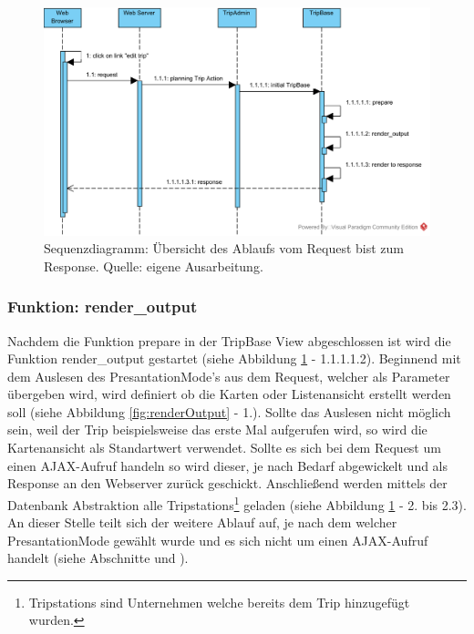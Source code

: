 \documentclass[Bachelorarbeit.tex]{subfiles}
\begin{document}
\begin{figure}[h]
\centering
\includegraphics[width=1\linewidth]{img/Implementierung/Overview}
\caption[k]{Sequenzdiagramm: Übersicht des Ablaufs vom Request bist zum Response. Quelle: eigene Ausarbeitung.}
\label{fig:Overview}
\end{figure}

\subsubsection*{Funktion: render\_output}
\label{renderOutput}
Nachdem die Funktion prepare in der TripBase View abgeschlossen ist wird die Funktion render\_output gestartet (siehe Abbildung \ref{fig:Overview} - 1.1.1.1.2).
Beginnend mit dem Auslesen des PresantationMode's aus dem Request, welcher als Parameter übergeben wird, wird definiert ob die Karten oder Listenansicht erstellt werden soll (siehe Abbildung \ref{fig:renderOutput} - 1.).
Sollte das Auslesen nicht möglich sein, weil der Trip beispielsweise das erste Mal aufgerufen wird, so wird die Kartenansicht als Standartwert verwendet.
Sollte es sich bei dem Request um einen \ac{AJAX}-Aufruf handeln so wird dieser, je nach Bedarf abgewickelt und als Response an den Webserver zurück geschickt.
Anschließend werden mittels der Datenbank Abstraktion alle Tripstations\footnote{Tripstations sind Unternehmen welche bereits dem Trip hinzugefügt wurden.} geladen (siehe Abbildung \ref{fig:Overview} - 2. bis 2.3).
An dieser Stelle teilt sich der weitere Ablauf auf, je nach dem welcher PresantationMode gewählt wurde und es sich nicht um einen \ac{AJAX}-Aufruf handelt (siehe Abschnitte  und ).\\
\end{document}
